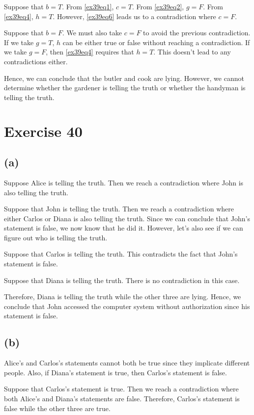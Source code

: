 \documentclass{article}
\begin{document}
Suppose that $b = T$. From \eqref{ex39eq1}, $c = T$.  From \eqref{ex39eq2}, $g = F$.  From \eqref{ex39eq4}, $h = T$. However, \eqref{ex39eq6} leads us to a contradiction where $c = F$.

Suppose that $b = F$.  We must also take $c = F$ to avoid the previous contradiction.  If we take $g = T$, $h$ can be either true or false without reaching a contradiction.  If we take $g = F$, then \eqref{ex39eq4} requires that $h = T$.  This doesn't lead to any contradictions either.

Hence, we can conclude that the butler and cook are lying. However, we cannot determine whether the gardener is telling the truth or whether the handyman is telling the truth.

\pagebreak

\section{Exercise 40}

\subsection{(a)}

Suppose Alice is telling the truth. Then we reach a contradiction where John is also telling the truth.

Suppose that John is telling the truth. Then we reach a contradiction where either Carlos or Diana is also telling the truth. Since we can conclude that John's statement is false, we now know that he did it. However, let's also see if we can figure out who is telling the truth.

Suppose that Carlos is telling the truth. This contradicts the fact that John's statement is false.

Suppose that Diana is telling the truth. There is no contradiction in this case.

Therefore, Diana is telling the truth while the other three are lying. Hence, we conclude that John accessed the computer system without authorization since his statement is false.

\subsection{(b)}
Alice's and Carlos's statements cannot both be true since they implicate different people. Also, if Diana's statement is true, then Carlos's statement is false.

Suppose that Carlos's statement is true. Then we reach a contradiction where both Alice's and Diana's statements are false. Therefore, Carlos's statement is false while the other three are true.
\end{document}
